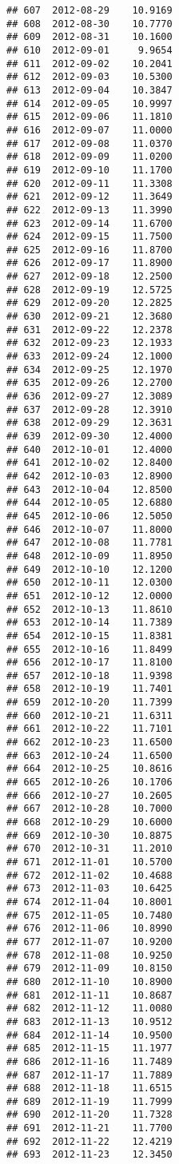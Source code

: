 \documentclass[
]{article}
\begin{document}
\begin{verbatim}
## 607  2012-08-29    10.9169
## 608  2012-08-30    10.7770
## 609  2012-08-31    10.1600
## 610  2012-09-01     9.9654
## 611  2012-09-02    10.2041
## 612  2012-09-03    10.5300
## 613  2012-09-04    10.3847
## 614  2012-09-05    10.9997
## 615  2012-09-06    11.1810
## 616  2012-09-07    11.0000
## 617  2012-09-08    11.0370
## 618  2012-09-09    11.0200
## 619  2012-09-10    11.1700
## 620  2012-09-11    11.3308
## 621  2012-09-12    11.3649
## 622  2012-09-13    11.3990
## 623  2012-09-14    11.6700
## 624  2012-09-15    11.7500
## 625  2012-09-16    11.8700
## 626  2012-09-17    11.8900
## 627  2012-09-18    12.2500
## 628  2012-09-19    12.5725
## 629  2012-09-20    12.2825
## 630  2012-09-21    12.3680
## 631  2012-09-22    12.2378
## 632  2012-09-23    12.1933
## 633  2012-09-24    12.1000
## 634  2012-09-25    12.1970
## 635  2012-09-26    12.2700
## 636  2012-09-27    12.3089
## 637  2012-09-28    12.3910
## 638  2012-09-29    12.3631
## 639  2012-09-30    12.4000
## 640  2012-10-01    12.4000
## 641  2012-10-02    12.8400
## 642  2012-10-03    12.8900
## 643  2012-10-04    12.8500
## 644  2012-10-05    12.6880
## 645  2012-10-06    12.5050
## 646  2012-10-07    11.8000
## 647  2012-10-08    11.7781
## 648  2012-10-09    11.8950
## 649  2012-10-10    12.1200
## 650  2012-10-11    12.0300
## 651  2012-10-12    12.0000
## 652  2012-10-13    11.8610
## 653  2012-10-14    11.7389
## 654  2012-10-15    11.8381
## 655  2012-10-16    11.8499
## 656  2012-10-17    11.8100
## 657  2012-10-18    11.9398
## 658  2012-10-19    11.7401
## 659  2012-10-20    11.7399
## 660  2012-10-21    11.6311
## 661  2012-10-22    11.7101
## 662  2012-10-23    11.6500
## 663  2012-10-24    11.6500
## 664  2012-10-25    10.8616
## 665  2012-10-26    10.1706
## 666  2012-10-27    10.2605
## 667  2012-10-28    10.7000
## 668  2012-10-29    10.6000
## 669  2012-10-30    10.8875
## 670  2012-10-31    11.2010
## 671  2012-11-01    10.5700
## 672  2012-11-02    10.4688
## 673  2012-11-03    10.6425
## 674  2012-11-04    10.8001
## 675  2012-11-05    10.7480
## 676  2012-11-06    10.8990
## 677  2012-11-07    10.9200
## 678  2012-11-08    10.9250
## 679  2012-11-09    10.8150
## 680  2012-11-10    10.8900
## 681  2012-11-11    10.8687
## 682  2012-11-12    11.0080
## 683  2012-11-13    10.9512
## 684  2012-11-14    10.9500
## 685  2012-11-15    11.1977
## 686  2012-11-16    11.7489
## 687  2012-11-17    11.7889
## 688  2012-11-18    11.6515
## 689  2012-11-19    11.7999
## 690  2012-11-20    11.7328
## 691  2012-11-21    11.7700
## 692  2012-11-22    12.4219
## 693  2012-11-23    12.3450

\end{verbatim}
\end{document}
